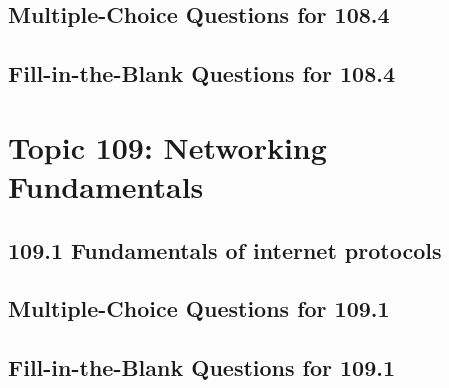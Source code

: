 \documentclass[a4paper]{report}
\begin{document}
\newpage
\section*{Multiple-Choice Questions for 108.4}

\newpage
\section*{Fill-in-the-Blank Questions for 108.4}

\newpage
\chapter{Topic 109: Networking Fundamentals}

\newpage
\section*{109.1 Fundamentals of internet protocols}

\newpage
\section*{Multiple-Choice Questions for 109.1}

\newpage
\section*{Fill-in-the-Blank Questions for 109.1}

\newpage
\end{document}
